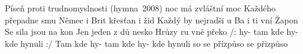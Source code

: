 \begin{TEXT}{Píseň proti trudnomyslnosti (hymna~2008)}
\SLOKA* {} noc má zvláštní moc \NL
Každého přepadne smu \NL
Němec i Brit křesťan i žid \NL
Každý by nejradši u \NL
Ba i ti vní Žapon \NL
Se sila jsou na kon \NL
Jen jeden z dů nesko \NL
Hrůzy ru vně překo 
\SLOKA* /:  hy- tam kde hy- kde hynuli  :/ \NL
Tam kde hy- tam kde hy- kde hynuli so \NL
{} se přizpůso  se přizpůso  \NL
\end{TEXT}
